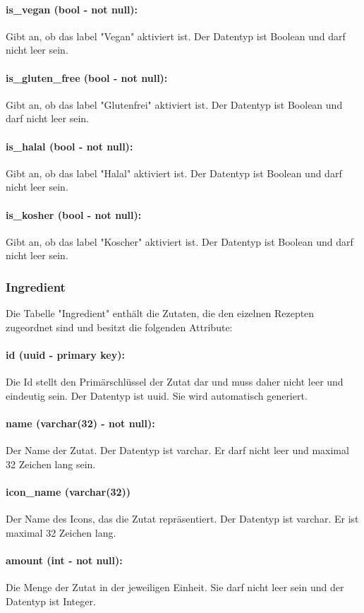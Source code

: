 \documentclass[parskip=full]{scrartcl}
\begin{document}
\paragraph{is\_vegan (bool - not null):} Gibt an, ob das \Gls{label} "Vegan" aktiviert ist. Der Datentyp ist Boolean und darf nicht leer sein.
\paragraph{is\_gluten\_free (bool - not null):} Gibt an, ob das \Gls{label} "Glutenfrei" aktiviert ist. Der Datentyp ist Boolean und darf nicht leer sein.
\paragraph{is\_halal (bool - not null):} Gibt an, ob das \Gls{label} "Halal" aktiviert ist. Der Datentyp ist Boolean und darf nicht leer sein.
\paragraph{is\_kosher (bool - not null):} Gibt an, ob das \Gls{label} "Koscher" aktiviert ist. Der Datentyp ist Boolean und darf nicht leer sein.
\newpage
\subsubsection{Ingredient}
Die Tabelle "Ingredient" enthält die Zutaten, die den eizelnen Rezepten zugeordnet sind und besitzt die folgenden Attribute:
\paragraph{id (uuid - primary key):} Die Id stellt den Primärschlüssel der Zutat dar und muss daher nicht leer und eindeutig sein. Der Datentyp ist \Gls{uuid}. Sie wird automatisch generiert. 
\paragraph{name (varchar(32) - not null):} Der Name der Zutat. Der Datentyp ist \Gls{varchar}. Er darf nicht leer und maximal 32 Zeichen lang sein.
\paragraph{icon\_name (varchar(32))} Der Name des Icons, das die Zutat repräsentiert. Der Datentyp ist \Gls{varchar}. Er ist maximal 32 Zeichen lang.
\paragraph{amount (int - not null):} Die Menge der Zutat in der jeweiligen Einheit. Sie darf nicht leer sein und der Datentyp ist Integer.
\end{document}

